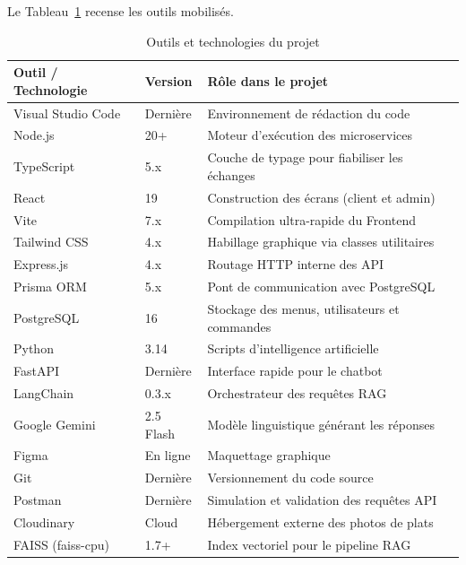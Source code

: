 Le Tableau~\ref{tab:env_logiciel} recense les outils mobilisés.

\begin{table}[H]
    \centering
    \caption{Outils et technologies du projet}
    \label{tab:env_logiciel}
    \renewcommand{\arraystretch}{1.3}
    \begin{tabular}{|p{3.5cm}|p{3cm}|p{6cm}|}
        \hline
        \textbf{Outil / Technologie} & \textbf{Version} & \textbf{Rôle dans le projet} \\
        \hline
        Visual Studio Code & Dernière & Environnement de rédaction du code \\
        \hline
        Node.js & 20+ & Moteur d'exécution des microservices \\
        \hline
        TypeScript & 5.x & Couche de typage pour fiabiliser les échanges \\
        \hline
        React & 19 & Construction des écrans (client et admin) \\
        \hline
        Vite & 7.x & Compilation ultra-rapide du Frontend \\
        \hline
        Tailwind CSS & 4.x & Habillage graphique via classes utilitaires \\
        \hline
        Express.js & 4.x & Routage HTTP interne des API \\
        \hline
        Prisma ORM & 5.x & Pont de communication avec PostgreSQL \\
        \hline
        PostgreSQL & 16 & Stockage des menus, utilisateurs et commandes \\
        \hline
        Python & 3.14 & Scripts d'intelligence artificielle \\
        \hline
        FastAPI & Dernière & Interface rapide pour le chatbot \\
        \hline
        LangChain & 0.3.x & Orchestrateur des requêtes RAG \\
        \hline
        Google Gemini & 2.5 Flash & Modèle linguistique générant les réponses \\
        \hline
        Figma & En ligne & Maquettage graphique \\
        \hline
        Git & Dernière & Versionnement du code source \\
        \hline
        Postman & Dernière & Simulation et validation des requêtes API \\
        \hline
        Cloudinary & Cloud & Hébergement externe des photos de plats \\
        \hline
        FAISS (faiss-cpu) & 1.7+ & Index vectoriel pour le pipeline RAG \\
        \hline
    \end{tabular}
\end{table}

